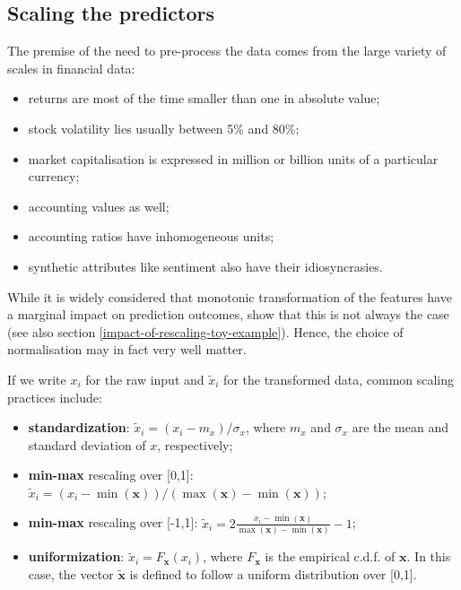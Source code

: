 \documentclass[]{krantz}
\providecommand{\tightlist}{%
  \setlength{\itemsep}{0pt}\setlength{\parskip}{0pt}}
\theoremstyle{definition}
\theoremstyle{definition}
\theoremstyle{definition}
\theoremstyle{remark}
\begin{document}
\hypertarget{scaling}{%
\subsection{Scaling the predictors}\label{scaling}}

The premise of the need to pre-process the data comes from the large
variety of scales in financial data:

\begin{itemize}
\tightlist
\item
  returns are most of the time smaller than one in absolute value;
\item
  stock volatility lies usually between 5\% and 80\%;
\item
  market capitalisation is expressed in million or billion units of a
  particular currency;
\item
  accounting values as well;
\item
  accounting ratios have inhomogeneous units;
\item
  synthetic attributes like sentiment also have their idiosyncrasies.
\end{itemize}

While it is widely considered that monotonic transformation of the
features have a marginal impact on prediction outcomes,
\citet{galili2016splitting} show that this is not always the case (see
also section \ref{impact-of-rescaling-toy-example}). Hence, the choice
of normalisation may in fact very well matter.

If we write \(x_i\) for the raw input and \(\tilde{x}_i\) for the
transformed data, common scaling practices include:

\begin{itemize}
\tightlist
\item
  \textbf{standardization}: \(\tilde{x}_i=(x_i-m_x)/\sigma_x\), where
  \(m_x\) and \(\sigma_x\) are the mean and standard deviation of \(x\),
  respectively;
\item
  \textbf{min-max} rescaling over {[}0,1{]}:
  \(\tilde{x}_i=(x_i-\min(\mathbf{x}))/(\max(\mathbf{x})-\min(\mathbf{x}))\);
\item
  \textbf{min-max} rescaling over {[}-1,1{]}:
  \(\tilde{x}_i=2\frac{x_i-\min(\mathbf{x})}{\max(\mathbf{x})-\min(\mathbf{x})}-1\);
\item
  \textbf{uniformization}: \(\tilde{x}_i=F_\mathbf{x}(x_i)\), where
  \(F_\mathbf{x}\) is the empirical c.d.f. of \(\mathbf{x}\). In this
  case, the vector \(\tilde{\mathbf{x}}\) is defined to follow a uniform
  distribution over {[}0,1{]}.
\end{itemize}
\end{document}

